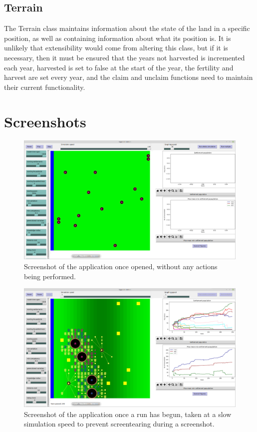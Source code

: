 \documentclass[12pt]{article}
\begin{document}
			\subsection{Terrain}
				The Terrain class maintains information about the state of the land in a specific position, as well as containing information about what its position is. It is unlikely that extensibility would come from altering this class, but if it is necessary, then it must be ensured that the years not harvested is incremented each year, harvested is set to false at the start of the year, the fertility and harvest are set every year, and the claim and unclaim functions need to maintain their current functionality. 
	\section{Screenshots}
	\begin{figure}[!htb]
		\includegraphics[width=15cm]{OnOpen}
		\caption{Screenshot of the application once opened, without any actions being performed.}
		\label{fig:OnOpen}
	\end{figure}
	
	\begin{figure}[!htb]
		\includegraphics[width=15cm]{WhileRunning}
		\caption{Screenshot of the application once a run has begun, taken at a slow simulation speed to prevent screentearing during a screenshot.}
		\label{fig:WhileRunning}
	\end{figure}
	
\end{document}
